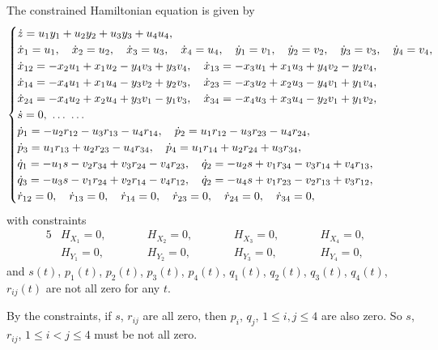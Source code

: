 The constrained Hamiltonian equation is given by
\begin{gather}
\begin{cases}
\dot{z} = u_1y_1 + u_2y_2 + u_3y_3 + u_4u_4,
\\
\dot{x}_1 = u_1, \quad \dot{x}_2 = u_2, \quad \dot{x}_3 = u_3, \quad \dot{x}_4 = u_4, \quad
\dot{y}_1 = v_1, \quad \dot{y}_2 = v_2, \quad \dot{y}_3 = v_3, \quad \dot{y}_4 = v_4,
\\
\dot{x}_{12} = - x_2u_1 + x_1u_2 - y_4v_3 + y_3v_4, \quad
\dot{x}_{13} = - x_3u_1 + x_1u_3 + y_4v_2 - y_2v_4,
\\
\dot{x}_{14} = - x_4u_1 + x_1u_4 - y_3v_2 + y_2v_3, \quad
\dot{x}_{23} = - x_3u_2 + x_2u_3 - y_4v_1 + y_1v_4,
\\
\dot{x}_{24} = - x_4u_2 + x_2u_4 + y_3v_1 - y_1v_3, \quad
\dot{x}_{34} = - x_4u_3 + x_3u_4 - y_2v_1 + y_1v_2,
\\
\dot{s} = 0, \ \dots \ \dots
\\
\dot{p}_1 = - u_2r_{12} - u_3r_{13} - u_4r_{14}, \quad \dot{p}_2 = u_1r_{12} - u_3r_{23} - u_4r_{24},
\\
\dot{p}_3 = u_1r_{13} + u_2r_{23} - u_4r_{34}, \quad \dot{p}_4 = u_1r_{14} + u_2r_{24} + u_3r_{34},
\\
\dot{q}_1 = - u_1s - v_2r_{34} + v_3r_{24} - v_4r_{23}, \quad \dot{q}_2 = - u_2s + v_1r_{34} - v_3r_{14} + v_4r_{13},
\\
\dot{q}_3 = - u_3s - v_1r_{24} + v_2r_{14} - v_4r_{12}, \quad \dot{q}_2 = - u_4s + v_1r_{23} - v_2r_{13} + v_3r_{12},
\\
\dot{r}_{12} = 0, \quad \dot{r}_{13} = 0, \quad \dot{r}_{14} = 0, \quad \dot{r}_{23} = 0, \quad \dot{r}_{24} = 0, \quad \dot{r}_{34} = 0,
\end{cases}\hspace{-10mm}
 \label{sharp}
\end{gather}
with constraints
\begin{alignat*}{5}
&H_{X_1} = 0, \qquad&& H_{X_2} = 0, \qquad&& H_{X_3} = 0, \qquad&& H_{X_4} = 0,& \\
&H_{Y_1} = 0, \qquad&& H_{Y_2} = 0, \qquad&& H_{Y_3} = 0, \qquad&& H_{Y_4} = 0,&
\end{alignat*}
and $s(t)$, $p_1(t)$, $p_2(t)$, $p_3(t)$, $p_4(t)$, $q_1(t)$, $q_2(t)$, $q_3(t)$, $q_4(t)$, $r_{ij}(t)$ are not all zero for any $t$.

By the constraints, if $s$, $r_{ij}$ are all zero, then $p_i$, $q_j$, $1 \leq i, j \leq 4$ are also zero.
So $s$, $r_{ij}$, $1 \leq i < j \leq 4$ must be not all zero.

